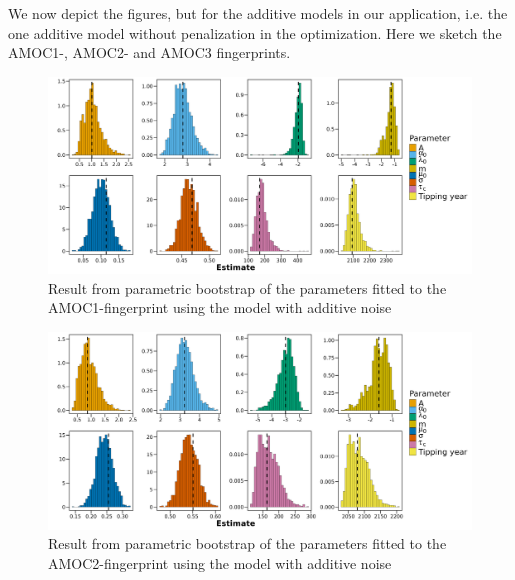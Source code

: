 We now depict the figures, but for the additive models in our application, i.e. the one additive model without penalization in the optimization. Here we sketch the AMOC1-, AMOC2- and AMOC3 fingerprints.
\begin{figure}[h!]
    \begin{center}
        \includegraphics[scale = .09]{figures/estim_tibble_AMOC1_plot.jpeg}
        \caption{Result from parametric bootstrap of the parameters fitted to the AMOC1-fingerprint using the model with additive noise}
        \label{figure:AMOC1_additive_bootstrap}
    \end{center}
\end{figure}

\begin{figure}[h!]
    \begin{center}
        \includegraphics[scale = .09]{figures/estim_tibble_additive_plot.jpeg}
        \caption{Result from parametric bootstrap of the parameters fitted to the AMOC2-fingerprint using the model with additive noise}
        \label{figure:AMOC2_additive_bootstrap}
    \end{center}
\end{figure}


